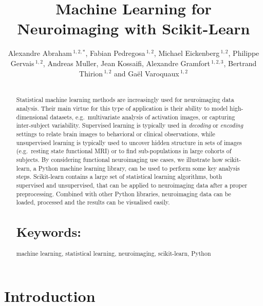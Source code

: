 \documentclass{frontiersSCNS} %
\def\firstAuthorLast{Alexandre Abraham {et~al}} %
\def\Authors{
    Alexandre Abraham\,$^{1,2,*}$,
    Fabian Pedregosa\,$^{1,2}$,
    Michael Eickenberg\,$^{1,2}$,
    Philippe Gervais\,$^{1,2}$,
    Andreas Muller,
    Jean Kossaifi,
    Alexandre Gramfort\,$^{1,2,3}$,
    Bertrand Thirion\,$^{1,2}$
    and Ga\"el Varoquaux\,$^{1,2}$}
\begin{document}
\onecolumn
{}

\title[Machine Learning for Neuroimaging with Scikit-Learn]{Machine Learning for Neuroimaging with Scikit-Learn}
\author[\firstAuthorLast ]{\Authors}
\address{}
\correspondance{}
\editor{}

\maketitle
\begin{abstract}

\section{}
Statistical machine learning methods are increasingly used for
neuroimaging data analysis. Their main virtue for this type of application
is their ability to model high-dimensional datasets, e.g.\ multivariate
analysis of activation images, or capturing inter-subject variability.
Supervised learning is typically used in \emph{decoding} or
\emph{encoding} settings to relate
brain images to behavioral or clinical observations, while
unsupervised learning is typically used to uncover hidden structure in
sets of images (e.g.\ resting state functional MRI) or to find
sub-populations in large cohorts of subjects. By considering
functional neuroimaging use cases, we illustrate how scikit-learn,
a Python machine learning library, can be used to perform some key
analysis steps. Scikit-learn contains a large set of statistical
learning algorithms, both supervised and unsupervised, that can be applied
to neuroimaging data after a proper preprocessing. Combined with other
Python libraries, neuroimaging data can be loaded, processed and the results
can be visualised easily.



\tiny
\section{Keywords:} machine learning, statistical learning, neuroimaging,
scikit-learn, Python
\end{abstract}


\section{Introduction}
\end{document}
